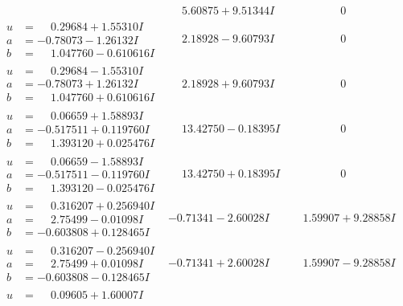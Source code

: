 \documentclass[1p]{elsarticle_modified}
\theoremstyle{definition}
\begin{document}
$$\begin{array}{c|c|c}
 & \phantom{-}5.60875 + 9.51344 I & \phantom{-0.000000 } 0 \\ \hline\begin{aligned}
u &= \phantom{-}0.29684 + 1.55310 I \\
a &= -0.78073 - 1.26132 I \\
b &= \phantom{-}1.047760 - 0.610616 I\end{aligned}
 & \phantom{-}2.18928 - 9.60793 I & \phantom{-0.000000 } 0 \\ \hline\begin{aligned}
u &= \phantom{-}0.29684 - 1.55310 I \\
a &= -0.78073 + 1.26132 I \\
b &= \phantom{-}1.047760 + 0.610616 I\end{aligned}
 & \phantom{-}2.18928 + 9.60793 I & \phantom{-0.000000 } 0 \\ \hline\begin{aligned}
u &= \phantom{-}0.06659 + 1.58893 I \\
a &= -0.517511 + 0.119760 I \\
b &= \phantom{-}1.393120 + 0.025476 I\end{aligned}
 & \phantom{-}13.42750 - 0.18395 I & \phantom{-0.000000 } 0 \\ \hline\begin{aligned}
u &= \phantom{-}0.06659 - 1.58893 I \\
a &= -0.517511 - 0.119760 I \\
b &= \phantom{-}1.393120 - 0.025476 I\end{aligned}
 & \phantom{-}13.42750 + 0.18395 I & \phantom{-0.000000 } 0 \\ \hline\begin{aligned}
u &= \phantom{-}0.316207 + 0.256940 I \\
a &= \phantom{-}2.75499 - 0.01098 I \\
b &= -0.603808 + 0.128465 I\end{aligned}
 & -0.71341 - 2.60028 I & \phantom{-}1.59907 + 9.28858 I \\ \hline\begin{aligned}
u &= \phantom{-}0.316207 - 0.256940 I \\
a &= \phantom{-}2.75499 + 0.01098 I \\
b &= -0.603808 - 0.128465 I\end{aligned}
 & -0.71341 + 2.60028 I & \phantom{-}1.59907 - 9.28858 I \\ \hline\begin{aligned}
u &= \phantom{-}0.09605 + 1.60007 I \\

\end{aligned}
\end{array}$$
\end{document}
